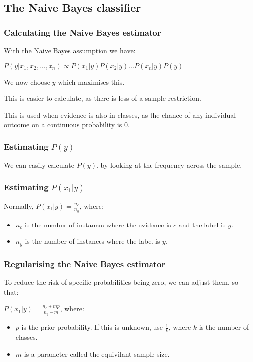 
\subsection{The Naive Bayes classifier}

\subsubsection{Calculating the Naive Bayes estimator}

With the Naive Bayes assumption we have:

\(P(y|x_1,x_2,...,x_n)\propto P(x_1|y)P(x_2|y)...P(x_n|y)P(y)\)

We now choose \(y\) which maximises this.

This is easier to calculate, as there is less of a sample restriction.

This is used when evidence is also in classes, as the chance of any individual outcome on a continuous probability is \(0\).

\subsubsection{Estimating \(P(y)\)}

We can easily calculate \(P(y)\), by looking at the frequency across the sample.

\subsubsection{Estimating \(P(x_1|y)\)}

Normally, \(P(x_1|y)=\frac{n_c}{n_y}\), where:

\begin{itemize}
\item \(n_c\) is the number of instances where the evidence is \(c\) and the label is \(y\).
\item \(n_y\) is the number of instances where the label is \(y\).
\end{itemize}

\subsubsection{Regularising the Naive Bayes estimator}

To reduce the risk of specific probabilities being zero, we can adjust them, so that:

\(P(x_1|y)=\frac{n_c+mp}{n_y+m}\), where:

\begin{itemize}
\item \(p\) is the prior probability. If this is unknown, use \(\frac{1}{k}\), where \(k\) is the number of classes.
\item \(m\) is a parameter called the equivilant sample size.
\end{itemize}

